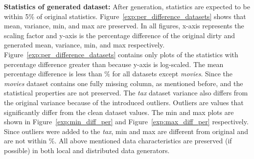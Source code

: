 \textbf{Statistics of generated dataset:} 
After generation, statistics are expected to be within 5\% of original statistics.
Figure~\ref{exp:per_difference_datasets} shows that mean, variance, min, and max are preserved.
In all figures, x-axis represents the scaling factor and y-axis is the percentage difference of the original dirty and generated mean, variance, min, and max respectively.
Figure~\ref{exp:per_difference_datasets} contains only plots of the statistics with percentage difference greater than  because y-axis is log-scaled.
The mean percentage difference is less than \% for all datasets except \textit{movies}.
Since the \textit{movies} dataset contains one fully missing column, as mentioned before, and the statistical properties are not preserved.
The \textit{tax} dataset variance also differs from the original variance because of the introduced outliers. 
Outliers are values that significantly differ from the clean dataset values.
The min and max plots are shown in Figure~\ref{exp:min_diff_per} and Figure~\ref{exp:max_diff_per} respectively.
Since outliers were added to the \textit{tax}, min and max are different from original and are not within \%.
All above mentioned data characteristics are preserved (if possible) in both local and distributed data generators.
